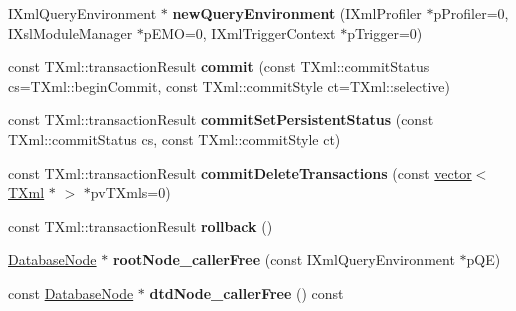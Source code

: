 \begin{DoxyCompactItemize}
\item 
\hypertarget{classgeneral__server_1_1Database_ae26a6f5ad9eaef973a8a3a29d86fbee9}{\-I\-Xml\-Query\-Environment $\ast$ {\bfseries new\-Query\-Environment} (\-I\-Xml\-Profiler $\ast$p\-Profiler=0, \-I\-Xsl\-Module\-Manager $\ast$p\-E\-M\-O=0, \-I\-Xml\-Trigger\-Context $\ast$p\-Trigger=0)}\label{classgeneral__server_1_1Database_ae26a6f5ad9eaef973a8a3a29d86fbee9}

\item 
\hypertarget{classgeneral__server_1_1Database_a1dd263d1b4a86317c71cc35dbdcbbf88}{const \-T\-Xml\-::transaction\-Result {\bfseries commit} (const \-T\-Xml\-::commit\-Status cs=\-T\-Xml\-::begin\-Commit, const \-T\-Xml\-::commit\-Style ct=\-T\-Xml\-::selective)}\label{classgeneral__server_1_1Database_a1dd263d1b4a86317c71cc35dbdcbbf88}

\item 
\hypertarget{classgeneral__server_1_1Database_ab69b02169f5ac7c2289d8ee72dc8271b}{const \-T\-Xml\-::transaction\-Result {\bfseries commit\-Set\-Persistent\-Status} (const \-T\-Xml\-::commit\-Status cs, const \-T\-Xml\-::commit\-Style ct)}\label{classgeneral__server_1_1Database_ab69b02169f5ac7c2289d8ee72dc8271b}

\item 
\hypertarget{classgeneral__server_1_1Database_a0a87ef1cc85b9433103131cc67526559}{const \-T\-Xml\-::transaction\-Result {\bfseries commit\-Delete\-Transactions} (const \hyperlink{classvector}{vector}$<$ \hyperlink{classgeneral__server_1_1TXml}{\-T\-Xml} $\ast$ $>$ $\ast$pv\-T\-Xmls=0)}\label{classgeneral__server_1_1Database_a0a87ef1cc85b9433103131cc67526559}

\item 
\hypertarget{classgeneral__server_1_1Database_a2fa31b68f1b7a8b3c27f8bde55d09ccf}{const \-T\-Xml\-::transaction\-Result {\bfseries rollback} ()}\label{classgeneral__server_1_1Database_a2fa31b68f1b7a8b3c27f8bde55d09ccf}

\item 
\hypertarget{classgeneral__server_1_1Database_a1fa444a14af788e0f3310ee1eedfc144}{\hyperlink{classgeneral__server_1_1DatabaseNode}{\-Database\-Node} $\ast$ {\bfseries root\-Node\-\_\-caller\-Free} (const \-I\-Xml\-Query\-Environment $\ast$p\-Q\-E)}\label{classgeneral__server_1_1Database_a1fa444a14af788e0f3310ee1eedfc144}

\item 
\hypertarget{classgeneral__server_1_1Database_a81d09dcc80ad794fb65a778482711c10}{const \hyperlink{classgeneral__server_1_1DatabaseNode}{\-Database\-Node} $\ast$ {\bfseries dtd\-Node\-\_\-caller\-Free} () const }\label{classgeneral__server_1_1Database_a81d09dcc80ad794fb65a778482711c10}


\end{DoxyCompactItemize}
